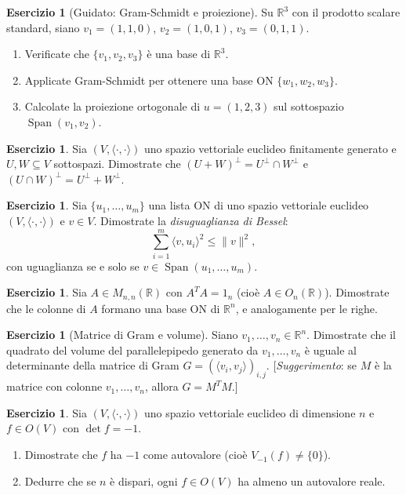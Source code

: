 \documentclass[11pt, a4paper]{book}
\theoremstyle{definition}
\newtheorem{esercizio}[definizione]{Esercizio}
\theoremstyle{plain}
\theoremstyle{remark}
\newcommand{\R}{\mathbb{R}}
\DeclareMathOperator{\Span}{Span}
\begin{document}
\begin{esercizio}[Guidato: Gram-Schmidt e proiezione]
\label{es:gram-schmidt-guidato}
Su $\R^3$ con il prodotto scalare standard, siano $v_1=(1,1,0)$, $v_2=(1,0,1)$, $v_3=(0,1,1)$.
\begin{enumerate}
  \item Verificate che $\{v_1,v_2,v_3\}$ è una base di $\R^3$.
  \item Applicate Gram-Schmidt per ottenere una base ON $\{w_1,w_2,w_3\}$.
  \item Calcolate la proiezione ortogonale di $u=(1,2,3)$ sul sottospazio $\Span(v_1,v_2)$.
\end{enumerate}
\end{esercizio}

\begin{esercizio}
Sia $(V,\langle\cdot,\cdot\rangle)$ uno spazio vettoriale euclideo finitamente generato e $U,W \subseteq V$ sottospazi. Dimostrate che $(U+W)^\perp = U^\perp \cap W^\perp$ e $(U \cap W)^\perp = U^\perp + W^\perp$.
\end{esercizio}

\begin{esercizio}
Sia $\{u_1,\ldots,u_m\}$ una lista ON di uno spazio vettoriale euclideo $(V,\langle\cdot,\cdot\rangle)$ e $v \in V$. Dimostrate la \emph{disuguaglianza di Bessel}:
\[
  \sum_{i=1}^m \langle v,u_i\rangle^2 \leq \|v\|^2,
\]
con uguaglianza se e solo se $v \in \Span(u_1,\ldots,u_m)$.
\end{esercizio}

\begin{esercizio}
Sia $A \in M_{n,n}(\R)$ con $A^T A = 1_n$ (cioè $A \in O_n(\R)$). Dimostrate che le colonne di $A$ formano una base ON di $\R^n$, e analogamente per le righe.
\end{esercizio}

\begin{esercizio}[Matrice di Gram e volume]
Siano $v_1,\ldots,v_n \in \R^n$. Dimostrate che il quadrato del volume del parallelepipedo generato da $v_1,\ldots,v_n$ è uguale al determinante della matrice di Gram $G = (\langle v_i,v_j\rangle)_{i,j}$. [\emph{Suggerimento}: se $M$ è la matrice con colonne $v_1,\ldots,v_n$, allora $G = M^T M$.]
\end{esercizio}

\begin{esercizio}
Sia $(V,\langle\cdot,\cdot\rangle)$ uno spazio vettoriale euclideo di dimensione $n$ e $f \in O(V)$ con $\det f = -1$.
\begin{enumerate}
  \item Dimostrate che $f$ ha $-1$ come autovalore (cioè $V_{-1}(f) \neq \{0\}$).
  \item Dedurre che se $n$ è dispari, ogni $f \in O(V)$ ha almeno un autovalore reale.
\end{enumerate}
\end{esercizio}
\end{document}

